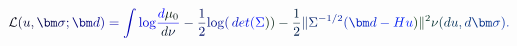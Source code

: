 \documentclass[12pt]{article}
\begin{document}
\makeatletter
\renewcommand*{\@textcolor}[3]{%
  \protect\leavevmode
  \begingroup
    \color#1{#2}#3%
  \endgroup
}
\makeatother
\begin{displaymath}
\mathcal { \mathcolor[RGB]{0,0,15}{L} } \mathcolor[RGB]{0,0,30}{(} \mathcolor[RGB]{0,0,45}{u} \mathcolor[RGB]{0,0,60}{,} \mathcolor[RGB]{0,0,75}{\bm} { \mathcolor[RGB]{0,0,90}{\sigma} } \mathcolor[RGB]{0,0,105}{;} \mathcolor[RGB]{0,0,120}{\bm} { \mathcolor[RGB]{0,0,135}{d} } \mathcolor[RGB]{0,0,150}{)} \mathcolor[RGB]{0,0,165}{=} \mathcolor[RGB]{0,0,180}{\int} \mathrm { \mathcolor[RGB]{0,0,195}{l} \mathcolor[RGB]{0,0,210}{o} \mathcolor[RGB]{0,0,225}{g} } \mathcolor[RGB]{0,0,240}{\frac { \mathcolor[RGB]{0,0,255}{d} \mathcolor[RGB]{0,15,0}{\mu} _ { \mathcolor[RGB]{0,15,15}{0} } } { \mathcolor[RGB]{0,15,30}{d} \mathcolor[RGB]{0,15,45}{\nu} } } \mathcolor[RGB]{0,15,60}{-} \mathcolor[RGB]{0,15,75}{\frac { \mathcolor[RGB]{0,15,90}{1} } { \mathcolor[RGB]{0,15,105}{2} } } \mathrm { \mathcolor[RGB]{0,15,120}{l} \mathcolor[RGB]{0,15,135}{o} \mathcolor[RGB]{0,15,150}{g} } \mathcolor[RGB]{0,15,165}{(} \mathcolor[RGB]{0,15,180}{\operatorname*} { \mathcolor[RGB]{0,15,195}{d} \mathcolor[RGB]{0,15,210}{e} \mathcolor[RGB]{0,15,225}{t} } \mathcolor[RGB]{0,15,240}{(} \mathcolor[RGB]{0,15,255}{\Sigma} \mathcolor[RGB]{0,30,0}{)} \mathcolor[RGB]{0,30,15}{)} \mathcolor[RGB]{0,30,30}{-} \mathcolor[RGB]{0,30,45}{\frac { \mathcolor[RGB]{0,30,60}{1} } { \mathcolor[RGB]{0,30,75}{2} } } \mathcolor[RGB]{0,30,90}{\|} \mathcolor[RGB]{0,30,105}{\Sigma} ^ { \mathcolor[RGB]{0,30,120}{-} \mathcolor[RGB]{0,30,135}{1} \mathcolor[RGB]{0,30,150}{/} \mathcolor[RGB]{0,30,165}{2} } \mathcolor[RGB]{0,30,180}{(} \mathcolor[RGB]{0,30,195}{\bm} { \mathcolor[RGB]{0,30,210}{d} } \mathcolor[RGB]{0,30,225}{-} \mathcolor[RGB]{0,30,240}{H} \mathcolor[RGB]{0,30,255}{u} \mathcolor[RGB]{0,45,0}{)} \mathcolor[RGB]{0,45,15}{\|} ^ { \mathcolor[RGB]{0,45,30}{2} } \mathcolor[RGB]{0,45,45}{\nu} \mathcolor[RGB]{0,45,60}{(} \mathcolor[RGB]{0,45,75}{d} \mathcolor[RGB]{0,45,90}{u} \mathcolor[RGB]{0,45,105}{,} \mathcolor[RGB]{0,45,120}{d} \mathcolor[RGB]{0,45,135}{\bm} { \mathcolor[RGB]{0,45,150}{\sigma} } \mathcolor[RGB]{0,45,165}{)} \mathcolor[RGB]{0,45,180}{.}
\end{displaymath}
\end{document}
